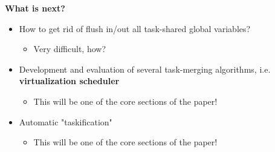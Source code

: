 \begin{frame}{\textbf{What is next?}}
	
	\begin{itemize}
		\item How to get rid of flush in/out all task-shared global variables?
		\begin{itemize}
			\item Very difficult, how?
		\end{itemize} 
		\item Development and evaluation of several task-merging algorithms, i.e. \textbf{ virtualization scheduler}
		\begin{itemize}
			\item This will be one of the core sections of the paper!
		\end{itemize}
		\item Automatic "taskification"
		\begin{itemize}
			\item This will be one of the core sections of the paper!
		\end{itemize}
	\end{itemize}
	
\end{frame}


